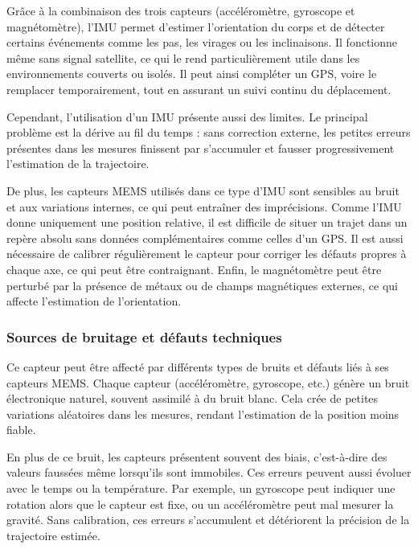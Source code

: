 \vspace{1em}

Grâce à la combinaison des trois capteurs (accéléromètre, gyroscope et magnétomètre), l’IMU permet d’estimer l’orientation du corps et de détecter certains événements comme les pas, les virages ou les inclinaisons. Il fonctionne même sans signal satellite, ce qui le rend particulièrement utile dans les environnements couverts ou isolés. Il peut ainsi compléter un GPS, voire le remplacer temporairement, tout en assurant un suivi continu du déplacement.

\vspace{1em}

Cependant, l’utilisation d’un IMU présente aussi des limites. Le principal problème est la dérive au fil du temps : sans correction externe, les petites erreurs présentes dans les mesures finissent par s’accumuler et fausser progressivement l’estimation de la trajectoire.

\vspace{1em}

De plus, les capteurs MEMS utilisés dans ce type d’IMU sont sensibles au bruit et aux variations internes, ce qui peut entraîner des imprécisions. Comme l’IMU donne uniquement une position relative, il est difficile de situer un trajet dans un repère absolu sans données complémentaires comme celles d’un GPS. Il est aussi nécessaire de calibrer régulièrement le capteur pour corriger les défauts propres à chaque axe, ce qui peut être contraignant. Enfin, le magnétomètre peut être perturbé par la présence de métaux ou de champs magnétiques externes, ce qui affecte l’estimation de l’orientation.

\vspace{2em}

\subsubsection{Sources de bruitage et défauts techniques}

Ce capteur peut être affecté par différents types de bruits et défauts liés à ses capteurs MEMS. Chaque capteur (accéléromètre, gyroscope, etc.) génère un bruit électronique naturel, souvent assimilé à du bruit blanc. Cela crée de petites variations aléatoires dans les mesures, rendant l’estimation de la position moins fiable.

\vspace{1em}

En plus de ce bruit, les capteurs présentent souvent des biais, c’est-à-dire des valeurs faussées même lorsqu’ils sont immobiles. Ces erreurs peuvent aussi évoluer avec le temps ou la température. Par exemple, un gyroscope peut indiquer une rotation alors que le capteur est fixe, ou un accéléromètre peut mal mesurer la gravité. Sans calibration, ces erreurs s’accumulent et détériorent la précision de la trajectoire estimée.

